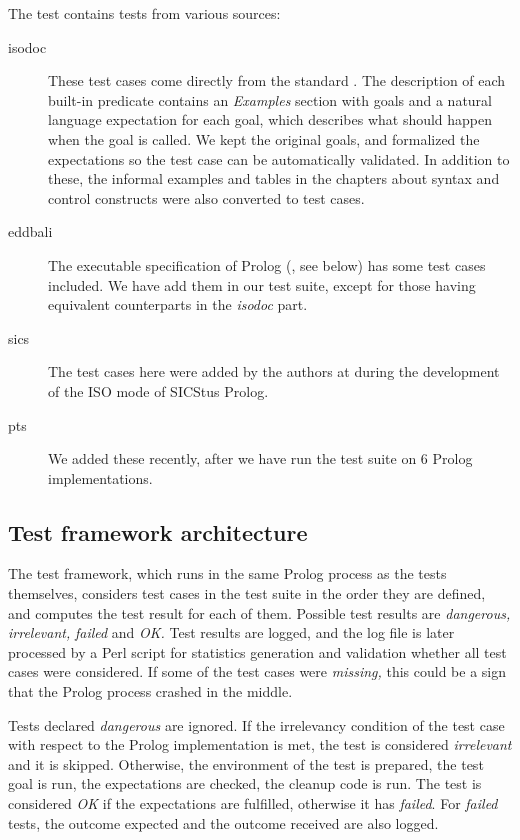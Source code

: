 \documentclass[draft]{llncs}%
\begin{document}
The test contains tests from various sources:

\begin{description}

\item[iso\textunderscore doc]
These test cases come directly from the
standard \cite{isoprolog95}. The description of each built-in predicate
contains an \emph{Examples} section with goals and a natural language
expectation for each goal, which describes what should happen when the goal
is called. We kept the original goals, and formalized the expectations so the
test case can be automatically validated.  In addition to these, the informal
examples and tables in the chapters about syntax and control constructs were
also converted to test cases.

\item[eddbali]
The executable specification of Prolog (\cite{executable}, see below) has
some test cases included. We have add them in our test suite, except
for those having equivalent counterparts in the \emph{iso\textunderscore doc}
part.

\item[sics]
The test cases here were added by the authors at during the development of
the ISO mode of SICStus Prolog.

\item[pts]
We added these recently, after we have run the test suite on 6 Prolog
implementations.

\end{description}

\subsection{Test framework architecture}

The test framework, which runs in the same Prolog process as the tests
themselves, considers test cases in the test suite in the order
they are defined, and computes the test result for each of them. Possible test
results are \emph{dangerous,} \emph{irrelevant,} \emph{failed} and
\emph{OK.} Test results are logged, and the log file is later processed by a
Perl script for statistics generation and validation whether all test cases
were considered. If some of the test cases were \emph{missing,} this could be
a sign that the Prolog process crashed in the middle.

Tests declared \emph{dangerous} are ignored. If the irrelevancy condition of
the test case with respect to the Prolog implementation is met, the test is
considered \emph{irrelevant} and it is skipped.
Otherwise, the environment of the test is prepared, the test goal is run, the
expectations are checked, the cleanup code is run. The test is considered
\emph{OK} if the expectations are fulfilled, otherwise it has \emph{failed}.
For \emph{failed} tests, the outcome expected and the outcome
received are also logged.
\end{document}
